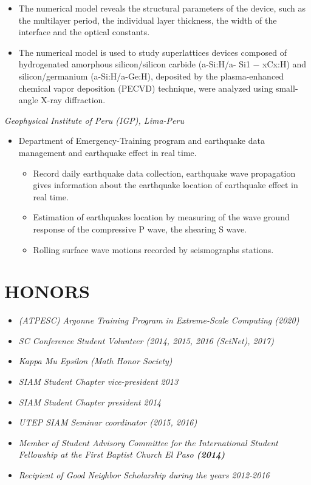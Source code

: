 \documentclass[margin]{res}
\begin{document}
\begin{resume}
\begin{itemize}
\begin{itemize}
\item The numerical model reveals the structural parameters of the device, such as the multilayer period, the individual layer thickness, the width of the interface and the optical constants. 
\item The numerical model is used to study superlattices devices composed of hydrogenated amorphous silicon/silicon carbide (a-Si:H/a- Si1 − xCx:H) and silicon/germanium (a-Si:H/a-Ge:H), deposited by the plasma-enhanced chemical vapor deposition (PECVD) technique, were
analyzed using small-angle X-ray diffraction.
\end{itemize}
\end{itemize} 
%
{\sl Geophysical Institute of Peru (IGP), Lima-Peru}%
\begin{itemize}\itemsep -2pt
\item Department of Emergency-Training program and earthquake data management and earthquake effect in real time.
\begin{itemize}
\item Record daily earthquake data collection, earthquake wave propagation gives information about the earthquake location of earthquake effect in real time.
\item Estimation of earthquakes location by measuring of the wave ground response of the compressive P wave, the shearing S wave.
\item Rolling surface wave motions recorded by seismographs stations.
\end{itemize}
\end{itemize} 

\section{HONORS} 
\begin{itemize}
 \item {\sl (ATPESC) Argonne Training Program in Extreme-Scale Computing (\it {2020})} %
 \item {\sl SC Conference Student Volunteer (\it {2014, 2015, 2016 (SciNet), 2017})} %
 \item {\sl Kappa Mu Epsilon (\it {Math Honor Society})} %
 \item {\sl SIAM Student Chapter vice-president 2013}
 \item {\sl SIAM Student Chapter president 2014} %
 \item {\sl UTEP SIAM Seminar coordinator (2015, 2016)}%
 \item {\sl Member of Student Advisory Committee for the International Student Fellowship at the First Baptist Church El Paso \bf (\it {2014})}%
 \item {\sl Recipient of Good Neighbor Scholarship during the years 2012-2016}   %
\end{itemize}


\end{resume}
\end{document}
